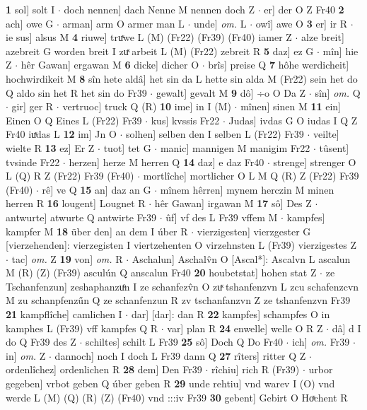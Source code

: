 \documentclass[8pt,a4paper,notitlepage]{article}
\begin{document}
\begin{table}[ht]
\begin{minipage}[t]{0.5\linewidth}
\textbf{1} sol] solt I  $\cdot$ doch nennen] dach Nenne M nennen doch Z  $\cdot$ er] der O Z Fr40 \textbf{2} ach] owe G  $\cdot$ arman] arm O armer man L  $\cdot$ unde] \textit{om.} L  $\cdot$ owî] awe O \textbf{3} er] ir R  $\cdot$ ie sus] alsus M \textbf{4} riuwe] truͯwe L (M) (Fr22) (Fr39) (Fr40) iamer Z  $\cdot$ alze breit] azebreit G worden breit I zuͯ arbeit L (M) (Fr22) zebreit R \textbf{5} daz] ez G  $\cdot$ mîn] hie Z  $\cdot$ hêr Gawan] ergawan M \textbf{6} dicke] dicher O  $\cdot$ brîs] preise Q \textbf{7} hôhe werdicheit] hochwirdikeit M \textbf{8} sîn hete aldâ] het sin da L hette sin alda M (Fr22) sein het do Q aldo sin het R het sin do Fr39  $\cdot$ gewalt] gevalt M \textbf{9} dô] ÷o O Da Z  $\cdot$ sîn] \textit{om.} Q  $\cdot$ gir] ger R  $\cdot$ vertruoc] truck Q (R) \textbf{10} ime] in I (M)  $\cdot$ mînen] sinen M \textbf{11} ein] Einen O Q Eines L (Fr22) Fr39  $\cdot$ kus] kvssis Fr22  $\cdot$ Judas] ivdas G O iudas I Q Z Fr40 iuͯdas L \textbf{12} im] Jn O  $\cdot$ solhen] selben den I selben L (Fr22) Fr39  $\cdot$ veilte] wielte R \textbf{13} ez] Er Z  $\cdot$ tuot] tet G  $\cdot$ manic] mannigen M manigim Fr22  $\cdot$ tûsent] tvsinde Fr22  $\cdot$ herzen] herze M herren Q \textbf{14} daz] e daz Fr40  $\cdot$ strenge] strenger O L (Q) R Z (Fr22) Fr39 (Fr40)  $\cdot$ mortlîche] mortlicher O L M Q (R) Z (Fr22) Fr39 (Fr40)  $\cdot$ rê] ve Q \textbf{15} an] daz an G  $\cdot$ mînem hêrren] mynem herczin M minen herren R \textbf{16} lougent] Lougnet R  $\cdot$ hêr Gawan] irgawan M \textbf{17} sô] Des Z  $\cdot$ antwurte] atwurte Q antwirte Fr39  $\cdot$ ûf] vf des L Fr39 vffem M  $\cdot$ kampfes] kampfer M \textbf{18} über den] an dem I úber R  $\cdot$ vierzigesten] vierzgester G [vierzehenden]: vierzegisten I viertzehenten O virzehnsten L (Fr39) vierzigestes Z  $\cdot$ tac] \textit{om.} Z \textbf{19} von] \textit{om.} R  $\cdot$ Aschalun] Aschalv̂n O [Ascal*]: Ascalvn L ascalun M (R) (Z) (Fr39) asculún Q anscalun Fr40 \textbf{20} houbetstat] hohen stat Z  $\cdot$ ze Tschanfenzun] zeshaphanzuͦn I ze schanfezv̂n O zuͯ tshanfenzvn L zcu schafenzcvn M zu schanpfenzűn Q ze schanfenzun R zv tschanfanzvn Z ze tshanfenzvn Fr39 \textbf{21} kampflîche] camlichen I  $\cdot$ dar] [dar]: dan R \textbf{22} kampfes] schampfes O in kamphes L (Fr39) vff kampfes Q R  $\cdot$ var] plan R \textbf{24} enwelle] welle O R Z  $\cdot$ dâ] d I do Q Fr39 des Z  $\cdot$ schiltes] schilt L Fr39 \textbf{25} sô] Doch Q Do Fr40  $\cdot$ ich] \textit{om.} Fr39  $\cdot$ in] \textit{om.} Z  $\cdot$ dannoch] noch I doch L Fr39 dann Q \textbf{27} rîters] ritter Q Z  $\cdot$ ordenlîchez] ordenlichen R \textbf{28} dem] Den Fr39  $\cdot$ rîchiu] rich R (Fr39)  $\cdot$ urbor gegeben] vrbot geben Q úber geben R \textbf{29} unde rehtiu] vnd warev I (O) vnd werde L (M) (Q) (R) (Z) (Fr40) vnd :::iv Fr39 \textbf{30} gebent] Gebirt O Hoͯchent R \newline

\end{minipage}
\end{table}
\end{document}
